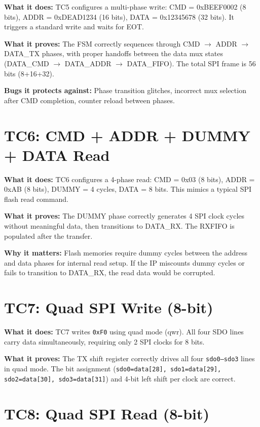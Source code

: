 \textbf{What it does:} TC5 configures a multi-phase write: CMD = 0xBEEF0002 (8 bits), ADDR =
0xDEAD1234 (16 bits), DATA = 0x12345678 (32 bits). It triggers a standard write and waits for EOT.

\textbf{What it proves:} The FSM correctly sequences through CMD $\rightarrow$ ADDR $\rightarrow$
DATA\_TX phases, with proper handoffs between the data mux states (DATA\_CMD $\rightarrow$
DATA\_ADDR $\rightarrow$ DATA\_FIFO). The total SPI frame is 56 bits (8+16+32).

\textbf{Bugs it protects against:} Phase transition glitches, incorrect mux selection after CMD
completion, counter reload between phases.

\section{TC6: CMD + ADDR + DUMMY + DATA Read}

\textbf{What it does:} TC6 configures a 4-phase read: CMD = 0x03 (8 bits), ADDR = 0xAB (8 bits),
DUMMY = 4 cycles, DATA = 8 bits. This mimics a typical SPI flash read command.

\textbf{What it proves:} The DUMMY phase correctly generates 4 SPI clock cycles without
meaningful data, then transitions to DATA\_RX. The RXFIFO is populated after the transfer.

\textbf{Why it matters:} Flash memories require dummy cycles between the address and data phases
for internal read setup. If the IP miscounts dummy cycles or fails to transition to DATA\_RX,
the read data would be corrupted.

\section{TC7: Quad SPI Write (8-bit)}

\textbf{What it does:} TC7 writes \texttt{0xF0} using quad mode (qwr). All four SDO lines carry
data simultaneously, requiring only 2 SPI clocks for 8 bits.

\textbf{What it proves:} The TX shift register correctly drives all four \texttt{sdo0--sdo3}
lines in quad mode. The bit assignment (\texttt{sdo0=data[28], sdo1=data[29], sdo2=data[30],
sdo3=data[31]}) and 4-bit left shift per clock are correct.

\section{TC8: Quad SPI Read (8-bit)}

